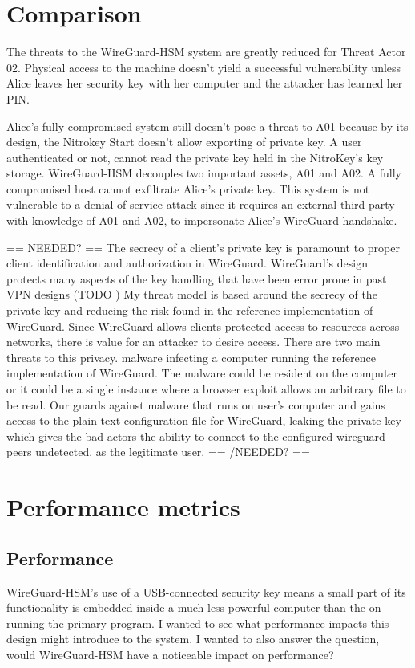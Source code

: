 \documentclass [11pt, proquest] {uwthesis}[2020/02/24]
\begin{document}
\section{Comparison}
The threats to the WireGuard-HSM system are greatly reduced for Threat Actor 02. Physical access to the machine doesn't yield a successful vulnerability unless Alice leaves her security key with her computer and the attacker has learned her PIN.

Alice's fully compromised system still doesn't pose a threat to A01 because by its design, the Nitrokey Start doesn't allow exporting of private key. A user authenticated or not, cannot read the private key held in the NitroKey's key storage.
WireGuard-HSM decouples two important assets, A01 and A02. A fully compromised host cannot exfiltrate Alice's private key. This system is not vulnerable to a denial of service attack since it requires an external third-party with knowledge of A01 and A02, to impersonate Alice's WireGuard handshake.



== NEEDED? ==
The secrecy of a client's private key is paramount to proper client identification and authorization in WireGuard. WireGuard's design protects many aspects of the key handling that have been error prone in past VPN designs (TODO )
My threat model is based around the secrecy of the private key and reducing the risk found in the reference implementation of WireGuard. Since WireGuard allows clients protected-access to resources across networks, there is value for an attacker to desire access. 
There are two main threats to this privacy.  malware infecting a computer running the reference implementation of WireGuard. The malware could be resident on the computer or it could be a single instance where a browser exploit allows an arbitrary file to be read. Our guards against malware that runs on user's computer and gains access to the plain-text configuration file for WireGuard, leaking the private key which gives the bad-actors the ability to connect to the configured wireguard-peers undetected, as the legitimate user.
== /NEEDED? ==



\section{Performance metrics}

\subsection{Performance}
WireGuard-HSM's use of a USB-connected security key means a small part of its functionality is embedded inside a much less powerful computer than the on running the primary program. I wanted to see what performance impacts this design might introduce to the system. I wanted to also answer the question, would WireGuard-HSM have a noticeable impact on performance?
\end{document}

